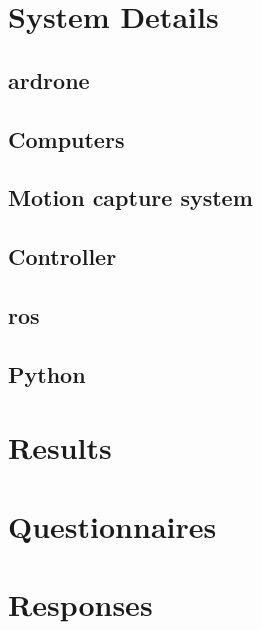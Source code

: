 \appendix
\chapter{System Details}
\section{\gls{ardrone}}
\section{Computers}  %
\section{Motion capture system}
\section{Controller}
\section{\gls{ros}}  %
\section{Python}

\chapter{Results}

\chapter{Questionnaires}

\chapter{Responses}

